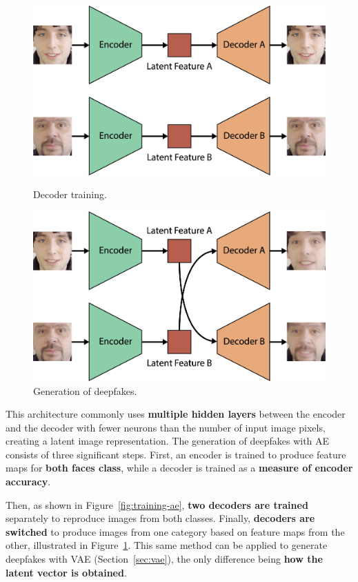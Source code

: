 \documentclass[preprint]{elsarticle}
\begin{document}
\begin{figure}[t]
	\centering
    \includegraphics[scale=0.6, keepaspectratio]{img/background_img/Training-AE.png}
    \caption{Decoder training.}\label{fig:training-ae}
	\includegraphics[scale=0.6, keepaspectratio]{img/background_img/Generation-AE2.png}
	\caption{Generation of deepfakes.}\label{fig:generation-ae}
\end{figure}


This architecture commonly uses \textbf{multiple hidden layers} between the encoder and the decoder with fewer neurons than the number of input image pixels, creating a latent image representation. 
The generation of deepfakes with AE consists of three significant steps.
First, an encoder is trained to produce feature maps for \textbf{both faces class}, while a decoder is trained as a \textbf{measure of encoder accuracy}. 

Then, as shown in Figure~\ref{fig:training-ae}, \textbf{two decoders are trained} separately to reproduce images from both classes. Finally, \textbf{decoders are switched} to produce images from one category based on feature maps from the other, illustrated in Figure~\ref{fig:generation-ae}. This same method can be applied to generate deepfakes with VAE (Section~\ref{sec:vae}), the only difference being \textbf{how the latent vector is obtained}.
\end{document}

